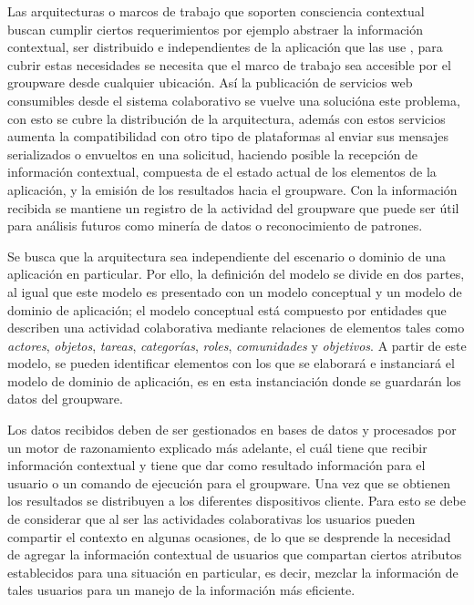 Las arquitecturas o marcos de trabajo que soporten consciencia contextual buscan cumplir ciertos requerimientos por ejemplo abstraer la informaci\'on contextual, ser distribuido e independientes de la aplicaci\'on que las use  \cite{dey1999architecture}, para cubrir estas necesidades se necesita que el marco de trabajo sea accesible por el groupware desde cualquier ubicaci\'on. As\'i la publicaci\'on de servicios web consumibles desde el sistema colaborativo se vuelve una soluci\'ona este problema, con esto se cubre la distribuci\'on de la arquitectura, adem\'as con estos servicios aumenta la compatibilidad con otro tipo de plataformas al enviar sus mensajes serializados o envueltos en una solicitud, haciendo posible la recepci\'on de informaci\'on contextual, compuesta de el estado actual de los elementos de la aplicaci\'on, y la emisi\'on de los resultados hacia el groupware. Con la informaci\'on recibida se mantiene un registro de la actividad del groupware que puede ser \'util para an\'alisis futuros como miner\'ia de datos o reconocimiento de patrones.

Se busca que la arquitectura sea independiente del escenario o dominio de una aplicaci\'on en particular. Por ello, la definici\'on del modelo se divide en dos partes, al igual que \cite{bohu2013} este modelo es presentado con un modelo conceptual y un modelo de dominio de aplicaci\'on; el modelo conceptual est\'a compuesto por entidades que describen una actividad colaborativa mediante relaciones de elementos tales como \textit{actores}, \textit{objetos}, \textit{tareas}, \textit{categor\'ias}, \textit{roles}, \textit{comunidades} y \textit{objetivos}. A partir de este modelo, se pueden identificar elementos con los que se elaborar\'a e instanciar\'a el modelo de dominio de aplicaci\'on, es en esta instanciaci\'on donde se guardar\'an los datos del groupware.

Los datos recibidos deben de ser gestionados en bases de datos y procesados por un motor de razonamiento explicado m\'as adelante, el cu\'al tiene que recibir informaci\'on contextual y tiene que dar como resultado informaci\'on para el usuario o un comando de ejecuci\'on para el groupware. Una vez que se obtienen los resultados se distribuyen a los diferentes dispositivos cliente. Para esto se debe de considerar que al ser las actividades colaborativas los usuarios pueden compartir el contexto en algunas ocasiones, de lo que se desprende la necesidad de agregar la informaci\'on contextual de usuarios que compartan ciertos atributos establecidos para una situaci\'on en particular, es decir, mezclar la informaci\'on de tales usuarios para un manejo de la informaci\'on m\'as eficiente.

